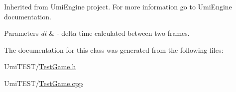 Inherited from Umi\+Engine project. For more information go to Umi\+Engine documentation. 


\begin{DoxyParams}{Parameters}
{\em dt} & -\/ delta time calculated between two frames. \\
\hline
\end{DoxyParams}


The documentation for this class was generated from the following files\+:\begin{DoxyCompactItemize}
\item 
Umi\+T\+E\+S\+T/\mbox{\hyperlink{_test_game_8h}{Test\+Game.\+h}}\item 
Umi\+T\+E\+S\+T/\mbox{\hyperlink{_test_game_8cpp}{Test\+Game.\+cpp}}\end{DoxyCompactItemize}
